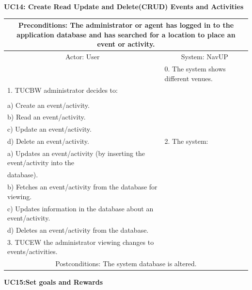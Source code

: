 \documentclass{article}
\begin{document}
     \newpage
     
				\vspace{5mm}
                \begin{flushleft}
				\textbf{UC14: Create Read Update and Delete(CRUD) Events and Activities}\\
                \end{flushleft}
        		\centering	
       		 \small
       		 \begin{tabular}{|p{6cm}|p{6cm}|}
       		 \hline
       		 \multicolumn{2}{c}{\parbox{12cm}{\vspace{2mm}Preconditions: The administrator or agent has logged in to the application database and has searched for a location to place an event or activity.\vspace{2mm}}} \\
       		 \hline
       		\multicolumn{1}{c}{Actor: User} & \multicolumn{1}{c}{ System: NavUP} \\
        		\hline
       		 & 0.	The system shows different venues.\\
       		 \hline
       		1.	TUCBW administrator decides to:\\

\\a)	Create an event/activity.
\\b)	Read an event/activity.
\\c)	Update an event/activity.
\\d)	Delete an event/activity.
 &2.	The system:

\\a)	Updates an event/activity (by inserting the event/activity into the \\database).
\\b)	Fetches an event/activity from the database for viewing.
\\c)	Updates information in the database about an event/activity.
\\d)	Deletes an event/activity from the database.
\\
        		\hline
       		3.	TUCEW the administrator viewing changes to events/activities.&\\
       		 \hline
        		\multicolumn{2}{c}{Postconditions: The system database is altered.}  \\
        		\hline
        \end{tabular} 
   \newpage
				\vspace{5mm}
                \begin{flushleft}
                \textbf{UC15:Set goals and Rewards}\\
                \end{flushleft}
\end{document}
